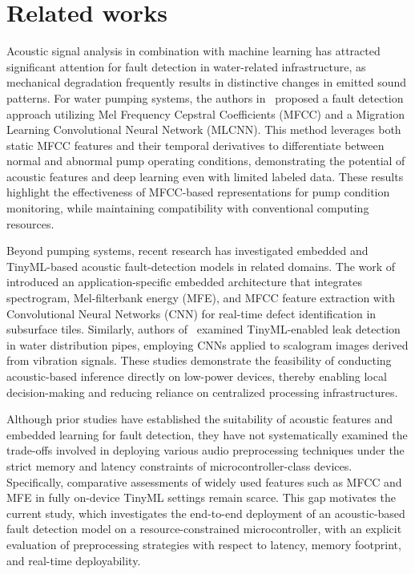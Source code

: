 \section{Related works}\label{sec:related_works}

Acoustic signal analysis in combination with machine learning has attracted significant attention for fault detection in water-related infrastructure, as mechanical degradation frequently results in distinctive changes in emitted sound patterns. For water pumping systems, the authors in~\cite{sun2023pump} proposed a fault detection approach utilizing Mel Frequency Cepstral Coefficients (MFCC) and a Migration Learning Convolutional Neural Network (MLCNN). This method leverages both static MFCC features and their temporal derivatives to differentiate between normal and abnormal pump operating conditions, demonstrating the potential of acoustic features and deep learning even with limited labeled data. These results highlight the effectiveness of MFCC-based representations for pump condition monitoring, while maintaining compatibility with conventional computing resources.

Beyond pumping systems, recent research has investigated embedded and TinyML-based acoustic fault-detection models in related domains. The work of~\cite{lin2024real} introduced an application-specific embedded architecture that integrates spectrogram, Mel-filterbank energy (MFE), and MFCC feature extraction with Convolutional Neural Networks (CNN) for real-time defect identification in subsurface tiles. Similarly, authors of~\cite{atanane2023smart} examined TinyML-enabled leak detection in water distribution pipes, employing CNNs applied to scalogram images derived from vibration signals. These studies demonstrate the feasibility of conducting acoustic-based inference directly on low-power devices, thereby enabling local decision-making and reducing reliance on centralized processing infrastructures.

Although prior studies have established the suitability of acoustic features and embedded learning for fault detection, they have not systematically examined the trade-offs involved in deploying various audio preprocessing techniques under the strict memory and latency constraints of microcontroller-class devices. Specifically, comparative assessments of widely used features such as MFCC and MFE in fully on-device TinyML settings remain scarce. This gap motivates the current study, which investigates the end-to-end deployment of an acoustic-based fault detection model on a resource-constrained microcontroller, with an explicit evaluation of preprocessing strategies with respect to latency, memory footprint, and real-time deployability.
